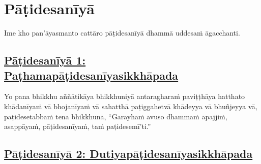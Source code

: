 
\section{Pāṭidesanīyā}
\label{pd}

\begin{intro}
	Ime kho pan'āyasmanto cattāro pāṭidesanīyā\makeatletter\hyperlink{endnote438-appendix}\makeatother{} dhammā uddesaṁ āgacchanti.
\end{intro}

\setsubsecheadstyle{\subsubsectionFmtalt}
\subsection*{\hyperref[ack1]{Pāṭidesanīyā 1: Paṭhamapāṭidesanīyasikkhāpada}}
\label{pd1}

Yo pana bhikkhu aññātikāya bhikkhuniyā antaragharaṁ paviṭṭhāya hatthato khādanīyaṁ vā bhojanīyaṁ\makeatletter\hyperlink{endnote439-appendix}\makeatother{} vā sahatthā paṭiggahetvā khādeyya vā bhuñjeyya vā, paṭidesetabbaṁ tena bhikkhunā, ``Gārayhaṁ āvuso dhammaṁ āpajjiṁ, asappāyaṁ, pāṭidesanīyaṁ,\makeatletter\hyperlink{endnote440-appendix}\makeatother{} taṁ paṭidesemī'ti.''\makeatletter\hyperlink{endnote441-appendix}\makeatother{}



\subsection*{\hyperref[ack2]{Pāṭidesanīyā 2: Dutiyapāṭidesanīyasikkhāpada}}
\label{pd2}

